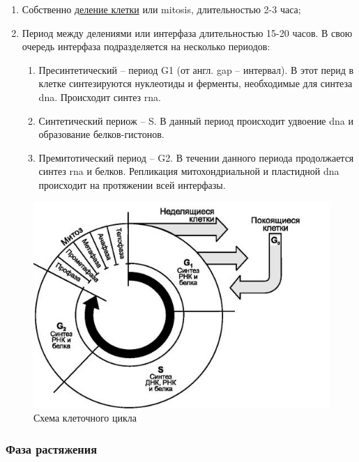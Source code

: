 \begin{enumerate}
	\item Собственно \hyperlink{question_mitosis}{деление клетки} или  \gls{mitosis}, длительностью 2-3 часа; 
	\item Период между делениями или интерфаза длительностью 15-20 часов. В свою очередь интерфаза подразделяется на несколько периодов: 
	\begin{enumerate}
		\item Пресинтетический -- период G1 (от англ. gap – интервал). В этот перид в клетке синтезируются нуклеотиды и ферменты, необходимые для синтеза \gls{dna}. Происходит синтез \gls{rna}.
		\item Синтетический периож -- S. В данный период происходит удвоение \gls{dna} и образование белков-гистонов.
		\item Премитотический период -- G2. В течении данного периода продолжается синтез \gls{rna} и белков. Репликация митохондриальной и пластидной \gls{dna} происходит на протяжении всей интерфазы.
	\end{enumerate}
\end{enumerate}

\begin{figure}
  \centering
       \includegraphics[width=0.5\linewidth]{pictures/cell_cykle}
\caption{Схема клеточного цикла}

\label{cell_cykle}
\end{figure}

\paragraph*{}

\subsubsection*{Фаза растяжения}

